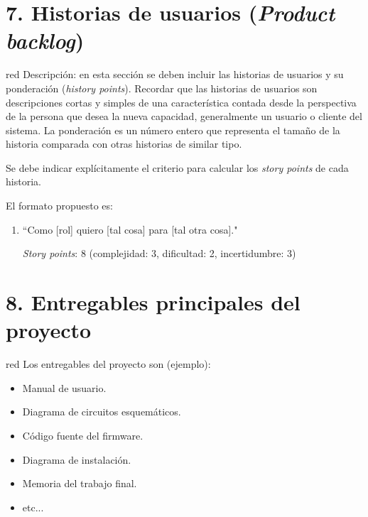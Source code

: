 \documentclass[
    11pt, %
]{charter}
\begin{document}
    \section{7. Historias de usuarios (\textit{Product backlog})}
    \label{sec:backlog}

    \begin{consigna}{red}
        Descripción: en esta sección se deben incluir las historias de usuarios y su ponderación (\textit{history points}). Recordar que las historias de usuarios son descripciones cortas y simples de una característica contada desde la perspectiva de la persona que desea la nueva capacidad, generalmente un usuario o cliente del sistema. La ponderación es un número entero que representa el tamaño de la historia comparada con otras historias de similar tipo.

        Se debe indicar explícitamente el criterio para calcular los \textit{story points} de cada historia.

        El formato propuesto es:
        \begin{enumerate}
            \item ``Como [rol] quiero [tal cosa] para [tal otra cosa]."

            \textit{Story points}: 8 (complejidad: 3, dificultad: 2, incertidumbre: 3)
        \end{enumerate}
    \end{consigna}


    \section{8. Entregables principales del proyecto}
    \label{sec:entregables}

    \begin{consigna}{red}
        Los entregables del proyecto son (ejemplo):

        \begin{itemize}
            \item Manual de usuario.
            \item Diagrama de circuitos esquemáticos.
            \item Código fuente del firmware.
            \item Diagrama de instalación.
            \item Memoria del trabajo final.
            \item etc...
        \end{itemize}
    \end{consigna}
\end{document}
